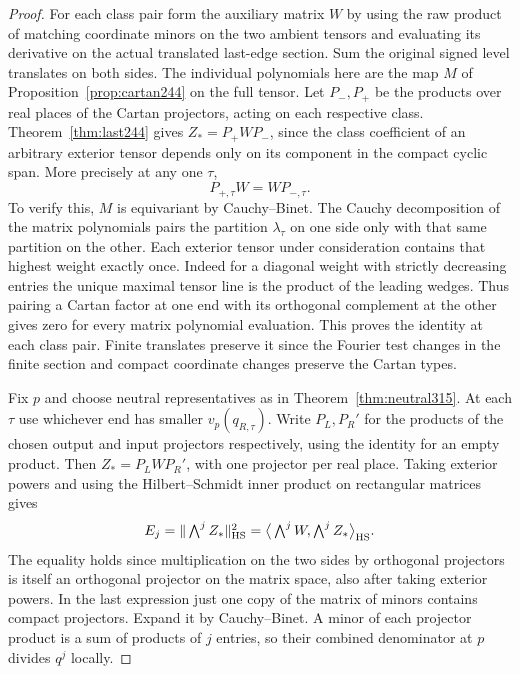 \documentclass[a4paper,11pt]{article}
\theoremstyle{definition}
\theoremstyle{remark}
\numberwithin{equation}{section}
\begin{document}
\begin{proof}
For each class pair form the auxiliary matrix \(W\) by
using the raw product of matching coordinate minors on
the two ambient tensors and evaluating its derivative
on the actual translated last-edge section. Sum the
original signed level translates on both sides. The
individual polynomials here are the map \(M\) of
Proposition~\ref{prop:cartan244} on the full tensor.
Let \(P_-,P_+\) be the products over real places of the
Cartan projectors, acting on each respective class.
Theorem~\ref{thm:last244} gives \(Z_*=P_+WP_-\), since
the class coefficient of an arbitrary exterior tensor
depends only on its component in the compact cyclic span.
More precisely at any one \(\tau\),
\[
             P_{+,\tau}W=WP_{-,\tau}.
\]
To verify this, \(M\) is equivariant by Cauchy--Binet.
The Cauchy decomposition of the matrix polynomials pairs
the partition \(\lambda_\tau\) on one side only with that
same partition on the other. Each exterior tensor under
consideration contains that highest weight exactly once.
Indeed for a diagonal weight with strictly decreasing
entries the unique maximal tensor line is the product
of the leading wedges. Thus pairing a Cartan factor at
one end with its orthogonal complement at the other gives
zero for every matrix polynomial evaluation. This proves
the identity at each class pair. Finite translates preserve
it since the Fourier test changes in the finite section
and compact coordinate changes preserve the Cartan types.

Fix \(p\) and choose neutral representatives as in
Theorem~\ref{thm:neutral315}. At each \(\tau\) use whichever
end has smaller \(v_p(q_{R,\tau})\). Write \(P_L,P_R'\)
for the products of the chosen output and input projectors
respectively, using the identity for an empty product.
Then \(Z_*=P_L W P_R'\), with one projector per real place.
Taking exterior powers and using the Hilbert--Schmidt
inner product on rectangular matrices gives
\[
 E_j=\|\textstyle\bigwedge^j Z_*\|_{\rm HS}^2
     =\big\langle\textstyle\bigwedge^j W,
                         \textstyle\bigwedge^j Z_*\big\rangle_{\rm HS}.
\]
The equality holds since multiplication on the two sides
by orthogonal projectors is itself an orthogonal projector
on the matrix space, also after taking exterior powers.
In the last expression just one copy of the matrix of
minors contains compact projectors. Expand it by
Cauchy--Binet. A minor of each projector product is a
sum of products of \(j\) entries, so their combined
denominator at \(p\) divides \(q^j\) locally.


\end{proof}
\end{document}
